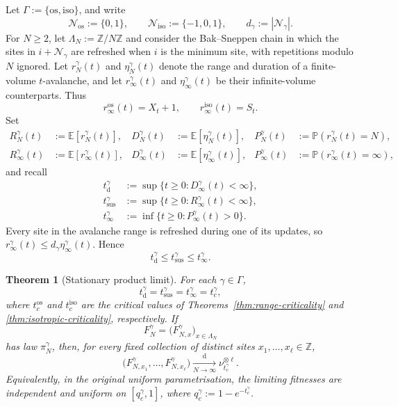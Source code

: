 \documentclass[11pt,a4paper]{amsart}
\newtheorem{theorem}{Theorem}[section]
\theoremstyle{remark}
\newcommand{\Z}{\mathbb Z}
\begin{document}
Let $\Gamma:=\{\mathrm{os},\mathrm{iso}\}$, and write
\[
        \mathcal N_{\mathrm{os}}:=\{0,1\},
        \qquad
        \mathcal N_{\mathrm{iso}}:=\{-1,0,1\},
        \qquad
        d_\gamma:=|\mathcal N_\gamma|.
\]
For $N\geq2$, let $\Lambda_N:=\Z/N\Z$ and consider the Bak--Sneppen
chain in which the sites in $i+\mathcal N_\gamma$ are refreshed when $i$
is the minimum site, with repetitions modulo $N$ ignored. Let
$r_N^\gamma(t)$ and $\eta_N^\gamma(t)$ denote the range and duration of a
finite-volume $t$-avalanche, and let $r_\infty^\gamma(t)$ and
$\eta_\infty^\gamma(t)$ be their infinite-volume counterparts. Thus
\[
        r_\infty^{\mathrm{os}}(t)=X_t+1,
        \qquad
        r_\infty^{\mathrm{iso}}(t)=S_t.
\]
Set
\[
\begin{aligned}
        R_N^\gamma(t)&:=\mathbb{E}[r_N^\gamma(t)],
        &D_N^\gamma(t)&:=\mathbb{E}[\eta_N^\gamma(t)],
        &P_N^\gamma(t)&:=\mathbb{P}(r_N^\gamma(t)=N),\\
        R_\infty^\gamma(t)&:=\mathbb{E}[r_\infty^\gamma(t)],
        &D_\infty^\gamma(t)&:=\mathbb{E}[\eta_\infty^\gamma(t)],
        &P_\infty^\gamma(t)&:=\mathbb{P}(r_\infty^\gamma(t)=\infty),
\end{aligned}
\]
and recall
\[
\begin{aligned}
        t_{\mathrm d}^\gamma
        &:=\sup\{t\geq0:D_\infty^\gamma(t)<\infty\},\\
        t_{\mathrm{sus}}^\gamma
        &:=\sup\{t\geq0:R_\infty^\gamma(t)<\infty\},\\
        t_\infty^\gamma
        &:=\inf\{t\geq0:P_\infty^\gamma(t)>0\}.
\end{aligned}
\]
Every site in the avalanche range is refreshed during one of its updates,
so $r_\infty^\gamma(t)\leq d_\gamma\eta_\infty^\gamma(t)$. Hence
\[
        t_{\mathrm d}^\gamma
        \leq t_{\mathrm{sus}}^\gamma
        \leq t_\infty^\gamma.
\]
\begin{theorem}[Stationary product limit]
\label{thm:stationary-product-limits}
For each $\gamma\in\Gamma$,
\[
        t_{\mathrm d}^\gamma
        =t_{\mathrm{sus}}^\gamma
        =t_\infty^\gamma
        =t_c^\gamma,
\]
where $t_c^{\mathrm{os}}$ and $t_c^{\mathrm{iso}}$ are the critical values
of Theorems~\ref{thm:range-criticality} and
\ref{thm:isotropic-criticality}, respectively. If
\[
        F_N^\gamma
        =\bigl(F_{N,x}^\gamma\bigr)_{x\in\Lambda_N}
\]
has law $\pi_N^\gamma$, then, for every fixed collection of distinct sites
$x_1,\ldots,x_\ell\in\mathbb Z$,
\[
        \bigl(
        F_{N,x_1}^\gamma,\ldots,F_{N,x_\ell}^\gamma
        \bigr)
        \xrightarrow[N\to\infty]{\mathrm d}
        \nu_{t_c^\gamma}^{\otimes\ell}.
\]
Equivalently, in the original uniform parametrisation, the limiting
fitnesses are independent and uniform on $[q_c^\gamma,1]$, where $q_c^\gamma:=1-e^{-t_c^\gamma}$.
\end{theorem}
\end{document}
